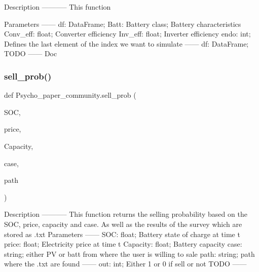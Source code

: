 \begin{DoxyVerb}Description
-----------
This function

Parameters
------
df: DataFrame;
Batt: Battery class; Battery characteristics
Conv_eff: float; Converter efficiency
Inv_eff: float; Inverter efficiency
endo: int; Defines the last element of the index we want to simulate
------
df: DataFrame;
TODO
------
Doc
\end{DoxyVerb}
 \mbox{\label{namespace_psycho__paper__community_a3e0bea6729bebaf15916a97fbf15e5ee}} 
\subsubsection{\texorpdfstring{sell\+\_\+prob()}{sell\_prob()}}
{\footnotesize\ttfamily def Psycho\+\_\+paper\+\_\+community.\+sell\+\_\+prob (\begin{DoxyParamCaption}\item[{}]{S\+OC,  }\item[{}]{price,  }\item[{}]{Capacity,  }\item[{}]{case,  }\item[{}]{path }\end{DoxyParamCaption})}

\begin{DoxyVerb}Description
-----------
This function returns the selling probability based on the SOC, price, capacity and case. As well as the results of the survey which are stored as .txt
Parameters
------
SOC: float; Battery state of charge at time t
price: float; Electricity price at time t
Capacity: float; Battery capacity
case: string; either PV or batt from where the user is willing to sale
path: string; path where the .txt are found
------
out: int; Either 1 or 0 if sell or not
TODO
------
\end{DoxyVerb}
 